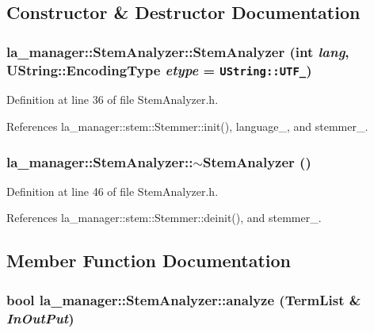 \subsection{Constructor \& Destructor Documentation}
\hypertarget{classla__manager_1_1StemAnalyzer_61ce978ad675e7c304a474ce072bbd37}{
\subsubsection[{StemAnalyzer}]{\setlength{\rightskip}{0pt plus 5cm}la\_\-manager::StemAnalyzer::StemAnalyzer (int {\em lang}, \/  UString::EncodingType {\em etype} = {\tt UString::UTF\_})}}
\label{classla__manager_1_1StemAnalyzer_61ce978ad675e7c304a474ce072bbd37}




Definition at line 36 of file StemAnalyzer.h.

References la\_\-manager::stem::Stemmer::init(), language\_\-, and stemmer\_\-.\hypertarget{classla__manager_1_1StemAnalyzer_8a0db479e0cb751532c54dfd717024cb}{
\subsubsection[{$\sim$StemAnalyzer}]{\setlength{\rightskip}{0pt plus 5cm}la\_\-manager::StemAnalyzer::$\sim$StemAnalyzer ()}}
\label{classla__manager_1_1StemAnalyzer_8a0db479e0cb751532c54dfd717024cb}




Definition at line 46 of file StemAnalyzer.h.

References la\_\-manager::stem::Stemmer::deinit(), and stemmer\_\-.

\subsection{Member Function Documentation}
\hypertarget{classla__manager_1_1StemAnalyzer_a3ad462a3d098e7abfbab604b47d1f21}{
\subsubsection[{analyze}]{\setlength{\rightskip}{0pt plus 5cm}bool la\_\-manager::StemAnalyzer::analyze ({\bf TermList} \& {\em InOutPut})}}
\label{classla__manager_1_1StemAnalyzer_a3ad462a3d098e7abfbab604b47d1f21}


